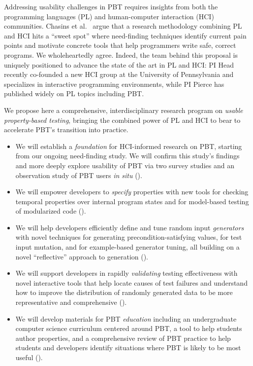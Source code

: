 Addressing usability challenges in PBT requires insights from both the
programming languages (PL) and
human-computer interaction (HCI) communities.  Chasins et
al.~\cite{chasins_pl_2021} argue that a research methodology
combining PL and HCI hits a ``sweet spot'' where need-finding techniques identify
current pain points and motivate concrete tools that help programmers write
safe, correct programs. We wholeheartedly agree.
Indeed, the team behind this proposal is uniquely positioned to advance the
state of the art in PL and HCI: PI Head recently co-founded
a new HCI group at the University of Pennsylvania and specializes in interactive
programming environments, while PI Pierce has
published widely on PL topics including PBT.

We propose here a comprehensive, interdisciplinary research program on
\emph{usable
property-based testing}, bringing the combined power of PL and HCI to bear to
accelerate PBT's transition into practice.
\begin{itemize}[noitemsep]
\item We will establish a \emph{foundation} for HCI-informed research on PBT,
starting from our ongoing need-finding study. We will confirm
this study's findings and more deeply explore usability of PBT via
two survey studies and an observation study
of PBT users {\em in situ} ().
  \item We will empower developers to \emph{specify} properties with
  new tools for checking temporal properties over internal program states and
for model-based testing of modularized code ().
  \item We will help developers efficiently define and tune random input
\emph{generators} with novel techniques for generating precondition-satisfying
values, for test input mutation, and for example-based generator
tuning, all building
  on a novel ``reflective'' approach to generation ().
  \item We will support developers in rapidly \emph{validating} testing
  effectiveness with novel interactive tools that help
locate causes of test failures and understand how to improve the
distribution of randomly generated
data to be more representative and comprehensive
().
  \item We will develop materials for PBT \emph{education}
  including an undergraduate computer science curriculum centered around PBT, a
  tool to help students author properties, and a comprehensive review of PBT
  practice to help students and developers identify situations where
  PBT is likely to be most useful ().
\end{itemize}

